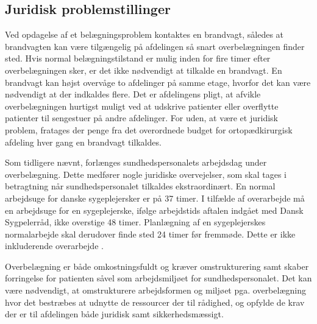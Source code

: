 \subsection{Juridisk problemstillinger}
Ved opdagelse af et belægningsproblem kontaktes en brandvagt, således at brandvagten kan være tilgængelig på afdelingen så snart overbelægningen finder sted. Hvis normal belægningstilstand er mulig inden for fire timer efter overbelægningen sker, er det ikke nødvendigt at tilkalde en brandvagt. En brandvagt kan højst overvåge to afdelinger på samme etage, hvorfor det kan være nødvendigt at der indkaldes flere. Det er afdelingens pligt, at  afvikle overbelægningen hurtigst muligt ved at udskrive patienter eller overflytte patienter til sengestuer på andre afdelinger. \cite{Beredskab2016} For uden, at være et juridisk problem, fratages der penge fra det overordnede budget for ortopædkirurgisk afdeling hver gang en brandvagt tilkaldes. \cite{[5] - dette skal undersøges om det er fra det samlede budget?} 

Som tidligere nævnt, forlænges sundhedspersonalets arbejdsdag under overbelægning. Dette medfører nogle juridiske overvejelser, som skal tages i betragtning når sundhedspersonalet tilkaldes ekstraordinært. En normal arbejdsuge for danske sygeplejersker er på 37 timer. \cite{Danske2015} I tilfælde af overarbejde må en arbejdsuge for en sygeplejerske, ifølge arbejdstids aftalen indgået med Dansk Sygpelerråd, ikke overstige 48 timer. Planlægning af en sygeplejerskes normalarbejde skal derudover finde sted 24 timer før fremmøde. Dette er ikke inkluderende overarbejde . \cite{Danske2015}

Overbelægning er både omkostningsfuldt og kræver omstrukturering samt skaber forringelse for patienten såvel som arbejdsmiljøet for sundhedspersonalet. Det kan være nødvendigt, at omstrukturere arbejdsformen og miljøet pga.  overbelægning hvor det bestræbes at udnytte de ressourcer der til rådighed, og opfylde de krav der er til afdelingen både juridisk samt sikkerhedsmæssigt. 










